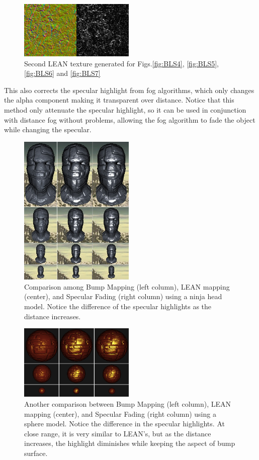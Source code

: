 \documentclass[10pt, conference]{IEEEtran}
\begin{document}
\begin{figure}[here]
	\includegraphics[width=0.49\textwidth]{figs/Lean22.png}
	\caption{Second LEAN texture generated for Figs.\ref{fig:BLS4}, \ref{fig:BLS5}, \ref{fig:BLS6} and \ref{fig:BLS7}}
	\label{fig:Lean22}
\end{figure}
This also corrects the specular highlight from fog algorithms, which only changes the alpha component making it transparent over distance. Notice that this method only attenuate the specular highlight, so it can be used in conjunction with distance fog without problems, allowing the fog algorithm to fade the object while changing the specular.
\begin{figure}[H]
	\includegraphics[width=0.49\textwidth]{figs/BLS1.png}
	\caption{Comparison among Bump Mapping (left column), LEAN mapping (center), and Specular Fading (right column) using a ninja head model. Notice the difference of the specular highlights as the distance increases.}
	\label{fig:BLS1}
\end{figure}

\begin{figure}[H]
	\includegraphics[width=0.49\textwidth]{figs/BLS2.png}
	\caption{Another comparison between Bump Mapping (left column), LEAN mapping (center), and Specular Fading (right column) using a sphere model. Notice the difference in the specular highlights. At close range, it is very similar to LEAN's, but as the distance increases, the highlight diminishes while keeping the aspect of bump surface.}
	\label{fig:BLS2}
\end{figure}
\end{document}
